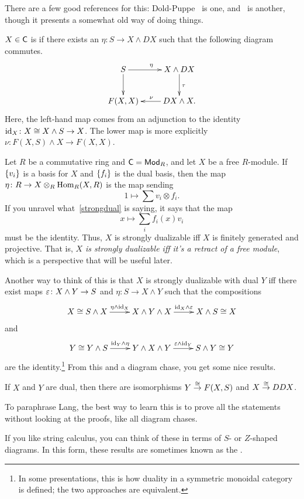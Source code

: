 There are a few good references for this: Dold-Puppe~\cite{DoldPuppe} is one, and~\cite{LMS} is another, though it
presents a somewhat old way of doing things.
\begin{defn}
$X\in\mathsf C$ is  if there exists an $\eta\colon S\to X\wedge DX$ such that the following
diagram commutes.
\begin{equation}
\label{strongdual}
\gathxy{
	S\ar[r]^\eta\ar[d] & X\wedge DX\ar[d]^\tau\\
	F(X,X) & DX\wedge X.\ar[l]_\nu
}
\end{equation}
Here, the left-hand map comes from an adjunction to the identity $\mathrm{id}_X\colon X\cong X\wedge S\to X$. The lower map
is more explicitly $\nu\colon F(X,S)\wedge X\to F(X,X)$.
\end{defn}
\begin{exm}
Let $R$ be a commutative ring and $\mathsf C = \mathsf{Mod}_R$, and let $X$ be a free $R$-module. If $\{v_i\}$ is a basis for
$X$ and $\{f_i\}$ is the dual basis, then the map $\eta\colon R\to X\otimes_R \operatorname{Hom}_R(X,R)$ is the map sending
\[1\mapsto \sum v_i\otimes f_i.\]
If you unravel what~\eqref{strongdual} is saying, it says that the map
\[x\mapsto \sum_i f_i(x)v_i\]
must be the identity. Thus, $X$ is strongly dualizable iff $X$ is finitely generated and projective. That is,
\emph{$X$ is strongly dualizable iff it's a retract of a free module}, which is a perspective that will be useful
later.
\end{exm}
Another way to think of this is that $X$ is strongly dualizable with dual $Y$ iff there exist maps $\varepsilon\colon
X\wedge Y\to S$ and $\eta\colon S\to X\wedge Y$ such that the compositions
\[\xymatrix{
	X\cong S\wedge X\ar[r]^-{\eta\wedge\id_X} & X\wedge Y\wedge X\ar[r]^-{\id_X\wedge\e} & X\wedge S\cong X
}\]
and
\[\xymatrix{
	Y\cong Y\wedge S\ar[r]^-{\id_Y\wedge\eta} & Y\wedge X\wedge Y\ar[r]^-{\e\wedge\id_Y} & S\wedge Y\cong Y
}\]
are the identity.\footnote{In some presentations, this is how duality in a symmetric monoidal category is defined;
the two approaches are equivalent.} From this and a diagram chase, you get some nice results.
\begin{prop} %
If $X$ and $Y$ are dual, then there are isomorphisms $Y\stackrel\cong\to F(X,S)$ and $X\stackrel\cong\to DDX$.
\end{prop}
To paraphrase Lang, the best way to learn this is to prove all the statements without looking at the proofs, like
all diagram chases.

If you like string calculus, you can think of these in terms of $S$- or $Z$-shaped diagrams. In this form, these
results are sometimes known as the .

